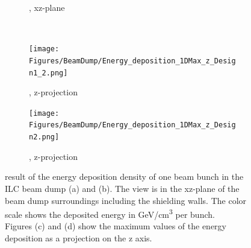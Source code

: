 \begin{figure}[!t]
\begin{subfigure}[b]{0.49\textwidth}
   \caption{\designtwo, xz-plane}
   \end{subfigure}\\ \vspace*{0.3cm}
     \begin{subfigure}[b]{0.485\textwidth}
   \centering
    \texttt{[image: Figures/BeamDump/Energy\_deposition\_1DMax\_z\_Design1\_2.png]}
   \caption{\designone, z-projection}
   \end{subfigure}
   \hfill
    \begin{subfigure}[b]{0.485\textwidth}
   \centering
    \texttt{[image: Figures/BeamDump/Energy\_deposition\_1DMax\_z\_Design2.png]}
   \caption{\designtwo, z-projection}
   \end{subfigure}
   \caption[Energy deposition in the ILC main beam dump]{\fluka result of the energy deposition density of one beam bunch in the ILC beam dump \designone (a) and \designtwo (b).
   The view is in the xz-plane of the beam dump surroundings including the shielding walls.
   The color scale shows the deposited energy in \si[detect-all]{\GeV}/\si{\centi\meter\cubed} per bunch.
   \\Figures (c) and (d) show the maximum values of the energy deposition as a projection on the z axis.}
   \label{fig:BeamDumps:Energy}
\end{figure}
 
